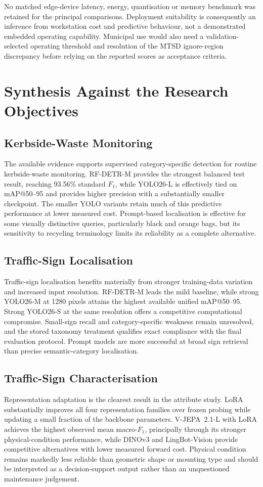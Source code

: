 No matched edge-device latency, energy, quantisation or memory benchmark was retained for the principal comparisons. Deployment suitability is consequently an inference from workstation cost and predictive behaviour, not a demonstrated embedded operating capability. Municipal use would also need a validation-selected operating threshold and resolution of the MTSD ignore-region discrepancy before relying on the reported scores as acceptance criteria.

\clearpage
\section{Synthesis Against the Research Objectives}
\label{sec:ev-objectives}
\subsection{Kerbside-Waste Monitoring}
The available evidence supports supervised category-specific detection for routine kerbside-waste monitoring. RF-DETR-M provides the strongest balanced test result, reaching 93.56\% standard \(F_1\), while YOLO26-L is effectively tied on \gls{mAP}@50--95 and provides higher precision with a substantially smaller checkpoint. The smaller YOLO variants retain much of this predictive performance at lower measured cost. Prompt-based localisation is effective for some visually distinctive queries, particularly black and orange bags, but its sensitivity to recycling terminology limits its reliability as a complete alternative.

\subsection{Traffic-Sign Localisation}
Traffic-sign localisation benefits materially from stronger training-data variation and increased input resolution. RF-DETR-M leads the mild baseline, while strong YOLO26-M at 1280 pixels attains the highest available unified \gls{mAP}@50--95. Strong YOLO26-S at the same resolution offers a competitive computational compromise. Small-sign recall and category-specific weakness remain unresolved, and the stored taxonomy treatment qualifies exact compliance with the final evaluation protocol. Prompt models are more successful at broad sign retrieval than precise semantic-category localisation.

\subsection{Traffic-Sign Characterisation}
Representation adaptation is the clearest result in the attribute study. \gls{LoRA} substantially improves all four representation families over frozen probing while updating a small fraction of the backbone parameters. V-JEPA~2.1-L with \gls{LoRA} achieves the highest observed mean macro-\(F_1\), principally through its stronger physical-condition performance, while DINOv3 and LingBot-Vision provide competitive alternatives with lower measured forward cost. Physical condition remains markedly less reliable than geometric shape or mounting type and should be interpreted as a decision-support output rather than an unquestioned maintenance judgement.

